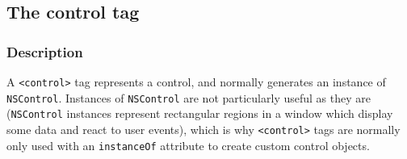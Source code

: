 %
%
%
%
%
%
%

\subsection{The control tag}

\subsubsection{Description}

A \texttt{<control>} tag represents a control, and normally generates
an instance of \texttt{NSControl}.  Instances of \texttt{NSControl}
are not particularly useful as they are (\texttt{NSControl} instances
represent rectangular regions in a window which display some data and
react to user events), which is why \texttt{<control>} tags are
normally only used with an \texttt{instanceOf} attribute to create
custom control objects.

